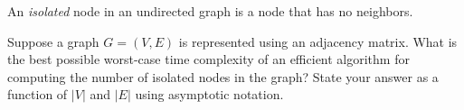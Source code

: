 \begin{prob}
    An \emph{isolated} node in an undirected graph is a node that has no
    neighbors.

    Suppose a graph $G = (V, E)$ is represented using an adjacency matrix. What
    is the best possible worst-case time complexity of an efficient algorithm
    for computing the number of isolated nodes in the graph? State your answer
    as a function of $|V|$ and $|E|$ using asymptotic notation.


\end{prob}
